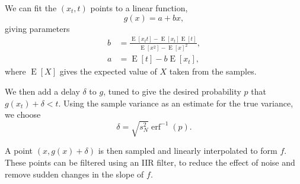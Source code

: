\documentclass[12pt,letterpaper]{article}
\DeclareMathOperator{\E}{E}
\DeclareMathOperator{\erf}{erf}
\begin{document}
We can fit the $(x_t, t)$ points to a linear function,
\begin{equation*}
  g(x) = a + bx,
\end{equation*}
giving parameters
\begin{align*}
  b & = \frac{\E[x_t t] - \E[x_t]\E[t]}{\E[x^2] - \E[x]^2}, \\
  a & = \E[t] - b\E[x_t],
\end{align*}
where $\E[X]$ gives the expected value of $X$ taken from the samples.

We then add a delay $\delta$ to $g$, tuned to give the desired probability $p$ that $g(x_t) + \delta < t$.
Using the sample variance as an estimate for the true variance, we choose
\begin{equation*}
  \delta = \sqrt{s_{N}^2} \erf^{-1}(p).
\end{equation*}

A point $(x, g(x)+\delta)$ is then sampled and linearly interpolated to form $f$.
These points can be filtered using an IIR filter, to reduce the effect of noise and remove sudden changes in the slope of $f$.
\end{document}
